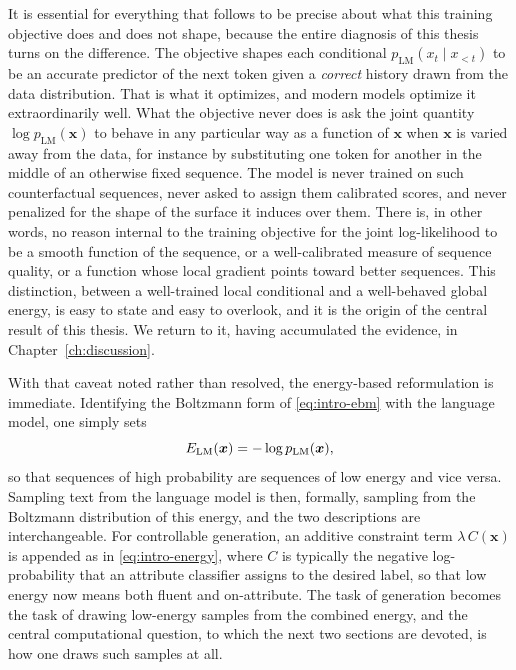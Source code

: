 It is essential for everything that follows to be precise about what this training objective does and does not shape, because the entire diagnosis of this thesis turns on the difference. The objective shapes each conditional $p_{\text{LM}}(x_t \mid x_{<t})$ to be an accurate predictor of the next token given a \emph{correct} history drawn from the data distribution. That is what it optimizes, and modern models optimize it extraordinarily well. What the objective never does is ask the joint quantity $\log p_{\text{LM}}(\bm{x})$ to behave in any particular way as a function of $\bm{x}$ when $\bm{x}$ is varied away from the data, for instance by substituting one token for another in the middle of an otherwise fixed sequence. The model is never trained on such counterfactual sequences, never asked to assign them calibrated scores, and never penalized for the shape of the surface it induces over them. There is, in other words, no reason internal to the training objective for the joint log-likelihood to be a smooth function of the sequence, or a well-calibrated measure of sequence quality, or a function whose local gradient points toward better sequences. This distinction, between a well-trained local conditional and a well-behaved global energy, is easy to state and easy to overlook, and it is the origin of the central result of this thesis. We return to it, having accumulated the evidence, in Chapter~\ref{ch:discussion}.

With that caveat noted rather than resolved, the energy-based reformulation is immediate. Identifying the Boltzmann form of \eqref{eq:intro-ebm} with the language model, one simply sets
\begin{equation}
    E_{\text{LM}}(\bm{x}) = -\log p_{\text{LM}}(\bm{x}),
    \label{eq:bg-energy}
\end{equation}
so that sequences of high probability are sequences of low energy and vice versa. Sampling text from the language model is then, formally, sampling from the Boltzmann distribution of this energy, and the two descriptions are interchangeable. For controllable generation, an additive constraint term $\lambda\, C(\bm{x})$ is appended as in \eqref{eq:intro-energy}, where $C$ is typically the negative log-probability that an attribute classifier assigns to the desired label, so that low energy now means both fluent and on-attribute. The task of generation becomes the task of drawing low-energy samples from the combined energy, and the central computational question, to which the next two sections are devoted, is how one draws such samples at all.

